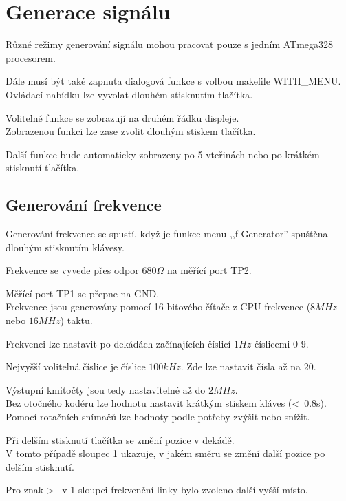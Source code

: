 \chapter{Generace signálu}
\vspace*{-1cm}
Různé režimy generování signálu mohou pracovat pouze s jedním ATmega328 procesorem.

Dále musí být také zapnuta dialogová funkce s volbou makefile WITH\_MENU.
\\Ovládací nabídku lze vyvolat dlouhém stisknutím tlačítka.

Volitelné funkce se zobrazují na druhém řádku displeje.
\\Zobrazenou funkci lze zase zvolit dlouhým stiskem tlačítka.

Další funkce bude automaticky zobrazeny po 5 vteřinách nebo po krátkém stisknutí tlačítka.
\label{sec:generation}
\vspace*{-0.6cm}
\section{Generování frekvence}
\vspace*{-0.3cm}
Generování frekvence se spustí, když je funkce menu ,,f-Generator'' spuštěna dlouhým stisknutím klávesy.

Frekvence se vyvede přes odpor \(680\Omega\) na měřící port TP2.

Měřící port TP1 se přepne na GND.
\\Frekvence jsou generovány pomocí 16 bitového čítače z CPU frekvence (\(8MHz\) nebo \(16MHz\)) taktu.

Frekvenci lze nastavit po dekádách začínajících číslicí \(1Hz\) číslicemi 0-9.

Nejvyšší volitelná číslice je číslice \(100kHz\). Zde lze nastavit čísla až na 20.

Výstupní kmitočty jsou tedy nastavitelné až do \(2MHz\).
\\Bez otočného kodéru lze hodnotu nastavit krátkým stiskem kláves (\textless~0.8s).
\\Pomocí rotačních snímačů lze hodnoty podle potřeby zvýšit nebo snížit.

Při delším stisknutí tlačítka se změní pozice v dekádě.
\\V tomto případě sloupec 1 ukazuje, v jakém směru se změní další pozice po delším stisknutí.

Pro znak \textgreater~ v 1 sloupci frekvenční linky bylo zvoleno další vyšší místo.


